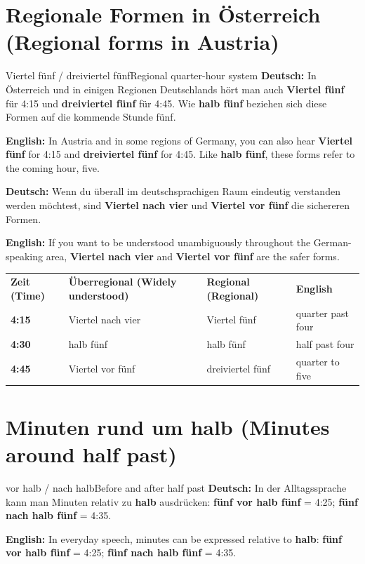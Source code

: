 \documentclass[a4paper,11pt]{article}
\newcommand{\GermanText}[1]{\textbf{Deutsch: }#1\par}
\newcommand{\EnglishText}[1]{{\small\color{SoftGray}\textbf{English: }#1\par}}
\begin{document}
\section{Regionale Formen in Österreich \textnormal{(Regional forms in Austria)}}
\begin{grammarentry}{Viertel fünf / dreiviertel fünf}{Regional quarter-hour system}
\GermanText{In Österreich und in einigen Regionen Deutschlands hört man auch \textbf{Viertel fünf} für 4:15 und \textbf{dreiviertel fünf} für 4:45. Wie \textbf{halb fünf} beziehen sich diese Formen auf die kommende Stunde fünf.}
\EnglishText{In Austria and in some regions of Germany, you can also hear \textbf{Viertel fünf} for 4:15 and \textbf{dreiviertel fünf} for 4:45. Like \textbf{halb fünf}, these forms refer to the coming hour, five.}
\GermanText{Wenn du überall im deutschsprachigen Raum eindeutig verstanden werden möchtest, sind \textbf{Viertel nach vier} und \textbf{Viertel vor fünf} die sichereren Formen.}
\EnglishText{If you want to be understood unambiguously throughout the German-speaking area, \textbf{Viertel nach vier} and \textbf{Viertel vor fünf} are the safer forms.}
\end{grammarentry}
\begin{longtable}{>{\bfseries}p{2.5cm}|p{4.5cm}|p{4.5cm}|p{3.2cm}}
\rowcolor{HeaderBlueDark}\color{white}\textbf{Zeit (Time)}&\color{white}\textbf{Überregional (Widely understood)}&\color{white}\textbf{Regional (Regional)}&\color{white}\textbf{English}\\
4:15 & Viertel nach vier & Viertel fünf & quarter past four \\
4:30 & halb fünf & halb fünf & half past four \\
4:45 & Viertel vor fünf & dreiviertel fünf & quarter to five \\
\end{longtable}
\section{Minuten rund um halb \textnormal{(Minutes around half past)}}
\begin{grammarentry}{vor halb / nach halb}{Before and after half past}
\GermanText{In der Alltagssprache kann man Minuten relativ zu \textbf{halb} ausdrücken: \textbf{fünf vor halb fünf} = 4:25; \textbf{fünf nach halb fünf} = 4:35.}
\EnglishText{In everyday speech, minutes can be expressed relative to \textbf{halb}: \textbf{fünf vor halb fünf} = 4:25; \textbf{fünf nach halb fünf} = 4:35.}
\end{grammarentry}
\end{document}
